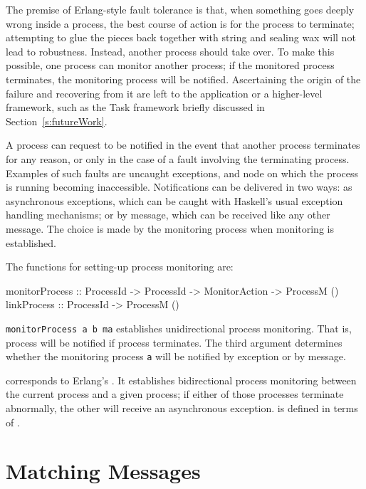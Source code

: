 \documentclass[preprint]{sigplanconf}
\begin{document}
The premise of Erlang-style fault tolerance is that, when something goes deeply wrong inside a process, the best course of action is for the process to terminate; attempting to glue the pieces back together with string and sealing wax will not lead to robustness.   Instead, another process should take over.  
To make this possible, one process can monitor another process; if the monitored process terminates, the monitoring process will be notified. 
Ascertaining the origin of the failure and recovering from it are left to the application or a higher-level framework, such as the Task framework briefly discussed in Section~\ref{s:futureWork}.

A process can request to be notified in the event that another process terminates for any reason, or only in the case of a fault involving the terminating process.
Examples of such faults are uncaught exceptions, and node on which the process is running becoming inaccessible. 
Notifications can be delivered in two ways: as asynchronous exceptions, which can be caught with Haskell's usual exception handling mechanisms; or by message, which can be received like any other message.
The choice is made by the monitoring process when monitoring is established.

The functions for setting-up process monitoring are:

\begin{code}
monitorProcess :: ProcessId -> ProcessId
               -> MonitorAction -> ProcessM ()
linkProcess    :: ProcessId -> ProcessM ()
\end{code}

\noindent
\lstinline!monitorProcess a b ma! establishes unidirectional process monitoring. That is, process  will be notified if process  terminates. The third argument determines whether the monitoring process \texttt{a} will be notified by exception or by message.

 corresponds to Erlang's . It establishes bidirectional process monitoring between the current process and a given process; if either of those processes terminate abnormally, the other will receive an asynchronous exception.  is defined in terms of . 

\section{Matching Messages}
\label{s:matching}
\end{document}
